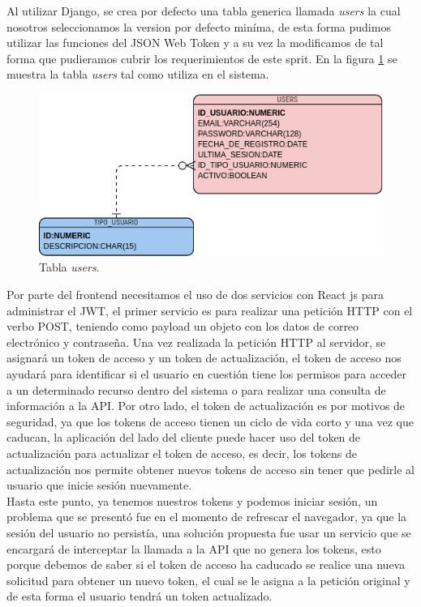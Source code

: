         Al utilizar Django, se crea por defecto una tabla generica llamada \textit{users} la cual nosotros seleccionamos
        la version por defecto miníma, de esta forma pudimos utilizar las funciones del JSON Web Token y a su vez la modificamos 
        de tal forma que pudieramos cubrir los requerimientos de este sprit.
        En la figura \ref{tbdb:users} se muestra la tabla \textit{users} tal como utiliza en el sistema. 
        \begin{figure}[H]
            \begin{center}
                \includegraphics[width=.7\textwidth]{sprints/imagenes/sp1mdd.png}
            \end{center}
            
            \caption{Tabla \textit{users}.}
            \label{tbdb:users}
        \end{figure}
    
        Por parte del frontend necesitamos el uso de dos servicios con React js para administrar el JWT, el primer servicio es para realizar una petición HTTP con el verbo POST, teniendo como payload un objeto con los datos de correo electrónico y contraseña. Una vez realizada la petición HTTP al servidor, se asignará un token de acceso y un token de actualización, el token de acceso nos ayudará para identificar si el usuario en cuestión tiene los permisos para acceder a un determinado recurso dentro del sistema o para realizar una consulta de información a la API. Por otro lado, el token de actualización es por motivos de seguridad, ya que los tokens de acceso tienen un ciclo de vida corto y una vez que caducan, la aplicación del lado del cliente puede hacer uso del token de actualización para actualizar el token de acceso, es decir, los tokens de actualización nos permite obtener nuevos tokens de acceso sin tener que pedirle al usuario que inicie sesión nuevamente.\\ 
        \newline
        Hasta este punto, ya tenemos nuestros tokens y podemos iniciar sesión, un problema que se presentó fue en el momento de refrescar el navegador, ya que la sesión del usuario no persistía, una solución propuesta fue usar un servicio que se encargará de interceptar la llamada a la API que no genera los tokens, esto porque debemos de saber si el token de acceso ha caducado se realice una nueva solicitud para obtener un nuevo token, el cual se le asigna a la petición original y de esta forma el usuario tendrá un token actualizado.\\ 
        \newline

